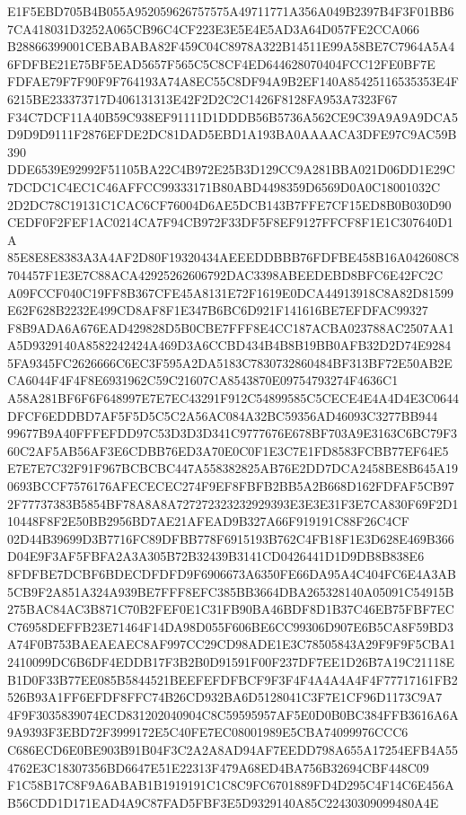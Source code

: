 \documentclass[UTF8,fontset=fandol,zihao=-4,a4paper]{ctexart}
\begin{document}
{{E1F5EBD705B4B055A952059626757575A49711771A356A049B2397B4F3F01BB67CA418031D3252A065CB96C4CF223E3E5E4E5AD3A64D057FE2CCA066
B28866399001CEBABABA82F459C04C8978A322B14511E99A58BE7C7964A5A46FDFBE21E75BF5EAD5657F565C5C8CF4ED644628070404FCC12FE0BF7E
FDFAE79F7F90F9F764193A74A8EC55C8DF94A9B2EF140A85425116535353E4F6215BE233373717D406131313E42F2D2C2C1426F8128FA953A7323F67
F34C7DCF11A40B59C938EF91111D1DDDB56B5736A562CE9C39A9A9A9DCA5D9D9D9111F2876EFDE2DC81DAD5EBD1A193BA0AAAACA3DFE97C9AC59B390
DDE6539E92992F51105BA22C4B972E25B3D129CC9A281BBA021D06DD1E29C7DCDC1C4EC1C46AFFCC99333171B80ABD4498359D6569D0A0C18001032C
2D2DC78C19131C1CAC6CF76004D6AE5DCB143B7FFE7CF15ED8B0B030D90CEDF0F2FEF1AC0214CA7F94CB972F33DF5F8EF9127FFCF8F1E1C307640D1A
85E8E8E8383A3A4AF2D80F19320434AEEEDDBBB76FDFBE458B16A042608C8704457F1E3E7C88ACA42925262606792DAC3398ABEEDEBD8BFC6E42FC2C
A09FCCF040C19FF8B367CFE45A8131E72F1619E0DCA44913918C8A82D81599E62F628B2232E499CD8AF8F1E347B6BC6D921F141616BE7EFDFAC99327
F8B9ADA6A676EAD429828D5B0CBE7FFF8E4CC187ACBA023788AC2507AA1A5D9329140A8582242424A469D3A6CCBD434B4B8B19BB0AFB32D2D74E9284
5FA9345FC2626666C6EC3F595A2DA5183C7830732860484BF313BF72E50AB2ECA6044F4F4F8E6931962C59C21607CA8543870E09754793274F4636C1
A58A281BF6F6F648997E7E7EC43291F912C54899585C5CECE4E4A4D4E3C0644DFCF6EDDBD7AF5F5D5C5C2A56AC084A32BC59356AD46093C3277BB944
99677B9A40FFFEFDD97C53D3D3D341C9777676E678BF703A9E3163C6BC79F360C2AF5AB56AF3E6CDBB76ED3A70E0C0F1E3C7E1FD8583FCBB77EF64E5
E7E7E7C32F91F967BCBCBC447A558382825AB76E2DD7DCA2458BE8B645A190693BCCF7576176AFECECEC274F9EF8FBFB2BB5A2B668D162FDFAF5CB97
2F77737383B5854BF78A8A8A727272323232929393E3E3E31F3E7CA830F69F2D110448F8F2E50BB2956BD7AE21AFEAD9B327A66F919191C88F26C4CF
02D44B39699D3B7716FC89DFBB778F6915193B762C4FB18F1E3D628E469B366D04E9F3AF5FBFA2A3A305B72B32439B3141CD0426441D1D9DB8B838E6
8FDFBE7DCBF6BDECDFDFD9F6906673A6350FE66DA95A4C404FC6E4A3AB5CB9F2A851A324A939BE7FFF8EFC385BB3664DBA265328140A05091C54915B
275BAC84AC3B871C70B2FEF0E1C31FB90BA46BDF8D1B37C46EB75FBF7ECC76958DEFFB23E71464F14DA98D055F606BE6CC99306D907E6B5CA8F59BD3
A74F0B753BAEAEAEC8AF997CC29CD98ADE1E3C78505843A29F9F9F5CBA12410099DC6B6DF4EDDB17F3B2B0D91591F00F237DF7EE1D26B7A19C21118E
B1D0F33B77EE085B5844521BEEFEFDFBCF9F3F4F4A4A4A4F4F77717161FB2526B93A1FF6EFDF8FFC74B26CD932BA6D5128041C3F7E1CF96D1173C9A7
4F9F3035839074ECD831202040904C8C59595957AF5E0D0B0BC384FFB3616A6A9A9393F3EBD72F3999172E5C40FE7EC08001989E5CBA74099976CCC6
C686ECD6E0BE903B91B04F3C2A2A8AD94AF7EEDD798A655A17254EFB4A554762E3C18307356BD6647E51E22313F479A68ED4BA756B32694CBF448C09
F1C58B17C8F9A6ABAB1B1919191C1C8C9FC6701889FD4D295C4F14C6E456AB56CDD1D171EAD4A9C87FAD5FBF3E5D9329140A85C22430309099480A4E
}}
\end{document}
